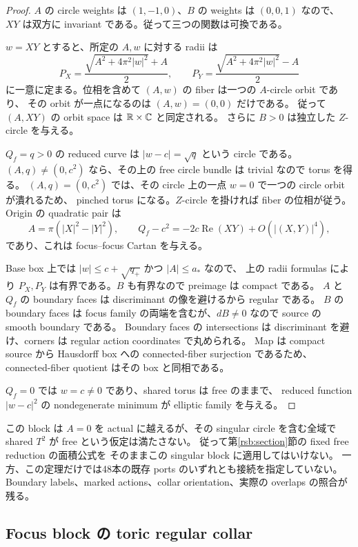 \begin{proof}
$A$ の circle weights は $(1,-1,0)$、$B$ の weights は $(0,0,1)$ なので、
$XY$ は双方に invariant である。従って三つの関数は可換である。

$w=XY$ とすると、所定の $A,w$ に対する radii は
\[
 P_X=\frac{\sqrt{A^2+4\pi^2|w|^2}+A}{2},\qquad
 P_Y=\frac{\sqrt{A^2+4\pi^2|w|^2}-A}{2}
\]
に一意に定まる。位相を含めて $(A,w)$ の fiber は一つの $A$-circle orbit であり、
その orbit が一点になるのは $(A,w)=(0,0)$ だけである。
従って $(A,XY)$ の orbit space は $\mathbb R\times\mathbb C$ と同定される。
さらに $B>0$ は独立した $Z$-circle を与える。

$Q_f=q>0$ の reduced curve は $|w-c|=\sqrt q$ という circle である。
$(A,q)\ne(0,c^2)$ なら、その上の free circle bundle は trivial なので torus を得る。
$(A,q)=(0,c^2)$ では、その circle 上の一点 $w=0$ で一つの circle orbit が潰れるため、
pinched torus になる。$Z$-circle を掛ければ fiber の位相が従う。
Origin の quadratic pair は
\[
 A=\pi(|X|^2-|Y|^2),\qquad
 Q_f-c^2=-2c\operatorname{Re}(XY)+O(|(X,Y)|^4),
\]
であり、これは focus--focus Cartan を与える。

Base box 上では $|w|\le c+\sqrt{q_+}$ かつ $|A|\le a_*$ なので、
上の radii formulas により $P_X,P_Y$ は有界である。$B$ も有界なので preimage は compact である。
$A$ と $Q_f$ の boundary faces は discriminant の像を避けるから regular である。
$B$ の boundary faces は focus family の両端を含むが、$dB\ne0$ なので source の smooth boundary である。
Boundary faces の intersections は discriminant を避け、corners は regular action coordinates で丸められる。
Map は compact source から Hausdorff box への connected-fiber surjection であるため、
connected-fiber quotient はその box と同相である。

$Q_f=0$ では $w=c\ne0$ であり、shared torus は free のままで、
reduced function $|w-c|^2$ の nondegenerate minimum が elliptic family を与える。
\end{proof}

この block は $A=0$ を actual に越えるが、その singular circle を含む全域で
shared $T^2$ が free という仮定は満たさない。
従って第\ref{rsb:section}節の fixed free reduction の面積公式を
そのままこの singular block に適用してはいけない。
一方、この定理だけでは48本の既存 ports のいずれとも接続を指定していない。
Boundary labels、marked actions、collar orientation、実際の overlaps の照合が残る。

\subsection{Focus block の toric regular collar}

